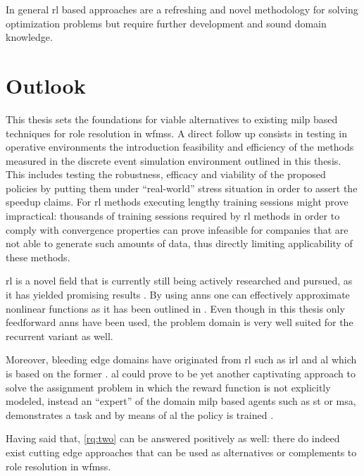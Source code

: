 In general \gls{rl} based approaches are a refreshing and novel methodology for solving optimization problems but require further development and sound domain knowledge.

\section{Outlook}
\label{sec:outlook}

This thesis sets the foundations for viable alternatives to existing \gls{milp} based techniques for role resolution in \glspl{wfms}. A direct follow up consists in testing in operative environments the introduction feasibility and efficiency of the methods measured in the discrete event simulation environment outlined in this thesis. This includes testing the robustness, efficacy and viability of the proposed policies by putting them under ``real-world'' stress situation in order to assert the speedup claims. For \gls{rl} methods executing lengthy training sessions might prove impractical: thousands of training sessions required by \gls{rl} methods in order to comply with convergence properties can prove infeasible for companies that are not able to generate such amounts of data, thus directly limiting applicability of these methods.

\gls{rl} is a novel field that is currently still being actively researched and pursued, as it has yielded promising results \citep{Mnih2015,Silver2016}. By using \glspl{ann} one can effectively approximate nonlinear functions as it has been outlined in . Even though in this thesis only feedforward \glspl{ann} have been used, the problem domain is very well suited for the recurrent variant as well.

Moreover, bleeding edge domains have originated from \gls{rl} such as \gls{irl} \citep{Ng2000} and \gls{al} which is based on the former \citep{Abbeel2004}. \gls{al} could prove to be yet another captivating approach to solve the assignment problem in which the reward function is not explicitly modeled, instead an ``expert'' of the domain \ie \gls{milp} based agents such as \gls{st} or \gls{msa}, demonstrates a task and by means of \gls{al} the policy is trained \citep{Abbeel2004}.

Having said that, \ref{rq:two} can be answered positively as well: there do indeed exist cutting edge approaches that can be used as alternatives or complements to role resolution in \glspl{wfms}. 
